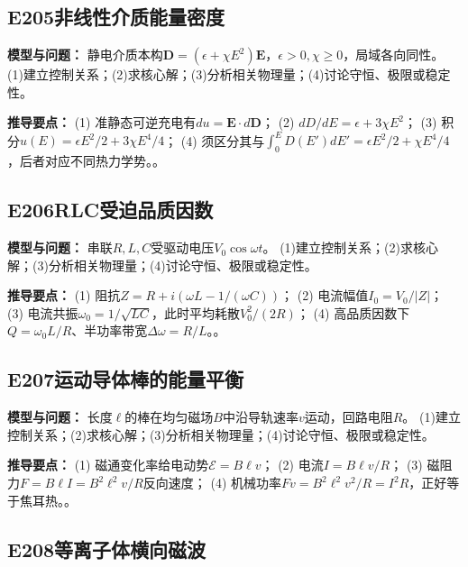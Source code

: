 \subsection*{E205\quad 非线性介质能量密度}

\textbf{模型与问题：} 静电介质本构$\mathbf D=(\epsilon+\chi E^2)\mathbf E$，$\epsilon>0,\chi\ge0$，局域各向同性。 (1)建立控制关系；(2)求核心解；(3)分析相关物理量；(4)讨论守恒、极限或稳定性。

\par\textbf{推导要点：} (1) 准静态可逆充电有$du=\mathbf E\cdot d\mathbf D$； (2) $dD/dE=\epsilon+3\chi E^2$； (3) 积分$u(E)=\epsilon E^2/2+3\chi E^4/4$； (4) 须区分其与$\int_0^E D(E')dE'=\epsilon E^2/2+\chi E^4/4$，后者对应不同热力学势。。

\par\medskip

\subsection*{E206\quad RLC受迫品质因数}

\textbf{模型与问题：} 串联$R,L,C$受驱动电压$V_0\cos\omega t$。 (1)建立控制关系；(2)求核心解；(3)分析相关物理量；(4)讨论守恒、极限或稳定性。

\par\textbf{推导要点：} (1) 阻抗$Z=R+i(\omega L-1/(\omega C))$； (2) 电流幅值$I_0=V_0/|Z|$； (3) 电流共振$\omega_0=1/\sqrt{LC}$，此时平均耗散$V_0^2/(2R)$； (4) 高品质因数下$Q=\omega_0L/R$、半功率带宽$\Delta\omega=R/L$。。

\par\medskip

\subsection*{E207\quad 运动导体棒的能量平衡}

\textbf{模型与问题：} 长度$\ell$的棒在均匀磁场$B$中沿导轨速率$v$运动，回路电阻$R$。 (1)建立控制关系；(2)求核心解；(3)分析相关物理量；(4)讨论守恒、极限或稳定性。

\par\textbf{推导要点：} (1) 磁通变化率给电动势$\mathcal E=B\ell v$； (2) 电流$I=B\ell v/R$； (3) 磁阻力$F=B\ell I=B^2\ell^2v/R$反向速度； (4) 机械功率$Fv=B^2\ell^2v^2/R=I^2R$，正好等于焦耳热。。

\par\medskip

\subsection*{E208\quad 等离子体横向磁波}

